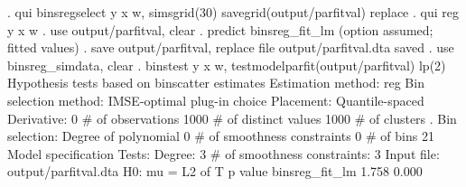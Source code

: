 . qui binsregselect y x w, simsgrid(30) savegrid(output/parfitval) replace
{\smallskip}
. qui reg y x w
{\smallskip}
. use output/parfitval, clear
{\smallskip}
. predict binsreg_fit_lm
(option {} assumed; fitted values)
{\smallskip}
. save output/parfitval, replace
file output/parfitval.dta saved
{\smallskip}
. use binsreg_simdata, clear
{\smallskip}
. binstest y x w, testmodelparfit(output/parfitval) lp(2)
{\smallskip}
Hypothesis tests based on binscatter estimates
Estimation method: reg
Bin selection method: IMSE-optimal plug-in choice
Placement: Quantile-spaced
Derivative: 0
{\smallskip}
\# of observations             {\VBAR}    1000
\# of distinct values          {\VBAR}    1000
\# of clusters                 {\VBAR}       .
Bin selection:                {\VBAR} 
         Degree of polynomial {\VBAR}       0
  \# of smoothness constraints {\VBAR}       0
                    \# of bins {\VBAR}      21
{\smallskip}
Model specification Tests:
Degree: 3     \# of smoothness constraints: 3
{\smallskip}
Input file: output/parfitval.dta
H0: mu =           {\VBAR} L2 of T           p value
   binsreg_fit_lm  {\VBAR}   1.758             0.000

